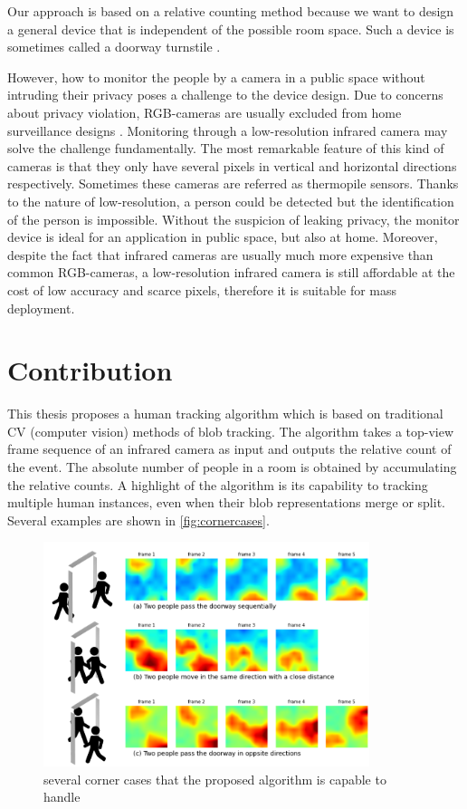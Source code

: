 Our approach is based on a relative counting method because we want to design a general device that is independent of the possible room space. Such a device is sometimes called a doorway turnstile \cite{griffiths2017empirical}.

However, how to monitor the people by a camera in a public space without intruding their privacy poses a challenge to the device design. Due to concerns about privacy violation, RGB-cameras are usually excluded from home surveillance designs \cite{privacyconcerns}. Monitoring through a low-resolution infrared camera may solve the challenge fundamentally. The most remarkable feature of this kind of cameras is that they only have several pixels in vertical and horizontal directions respectively. Sometimes these cameras are referred as thermopile sensors. Thanks to the nature of low-resolution, a person could be detected but the identification of the person is impossible. Without the suspicion of leaking privacy, the monitor device is ideal for an application in public space, but also at home. Moreover, despite the fact that infrared cameras are usually much more expensive than common RGB-cameras, a low-resolution infrared camera is still affordable at the cost of low accuracy and scarce pixels, therefore it is suitable for mass deployment.
\section{Contribution}
This thesis proposes a human tracking algorithm which is based on traditional CV (computer vision) methods of blob tracking. The algorithm takes a top-view frame sequence of an infrared camera as input and outputs the relative count of the event. The absolute number of people in a room is obtained by accumulating the relative counts. A highlight of the algorithm is its capability to tracking multiple human instances, even when their blob representations merge or split. Several examples are shown in \autoref{fig:cornercases}.
\begin{figure}
  \centering
  \includegraphics[width=0.85\textwidth]{figures/cornercases.PNG}
  \caption{several corner cases that the proposed algorithm is capable to handle}\label{fig:cornercases}
\end{figure}

